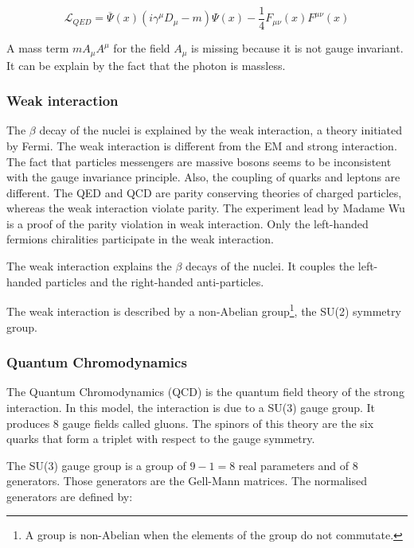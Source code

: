     \begin{equation}
    	\mathcal{L}_{QED} =  \overline{\Psi}\left(x\right)\left( i \gamma^\mu D_\mu - m \right) \Psi\left(x\right) - \frac{1}{4}F_{\mu \nu}\left(x\right) F^{\mu \nu}\left(x\right)
    \end{equation}

    A mass term $m A_{\mu} A^{\mu}$ for the field $A_{\mu}$ is missing because it is not gauge invariant. It can be explain by the fact that the photon is massless.


    \subsubsection{Weak interaction}

    The $\beta$ decay of the nuclei is explained by the weak interaction, a theory initiated by Fermi.
    The weak interaction is different from the EM and strong interaction.
    The fact that particles messengers are massive bosons seems to be inconsistent with the gauge invariance principle.
    Also, the coupling of quarks and leptons are different.
    The QED and QCD are parity conserving theories of charged particles, whereas the weak interaction violate parity.
    The experiment lead by Madame Wu is a proof of the parity violation in weak interaction. 
    Only the left-handed fermions chiralities participate in the weak interaction.
    
    The weak interaction explains the $\beta$ decays of the nuclei.
    It couples the left-handed particles and the right-handed anti-particles.
    
    The weak interaction is described by a non-Abelian group\footnote{A group is non-Abelian when the elements of the group do not commutate.}, the SU(2) symmetry group.
    
    \subsubsection{Quantum Chromodynamics}
    
    The Quantum Chromodynamics (QCD) is the quantum field theory of the strong interaction.
    In this model, the interaction is due to a SU(3) gauge group. 
    It produces 8 gauge fields called gluons.
    The spinors of this theory are the six quarks that form a triplet with respect to the gauge symmetry.

    The SU(3) gauge group is a group of $9 - 1 = 8$ real parameters and of 8 generators. 
    Those generators are the Gell-Mann matrices. 
    The normalised generators are defined by: 
    
